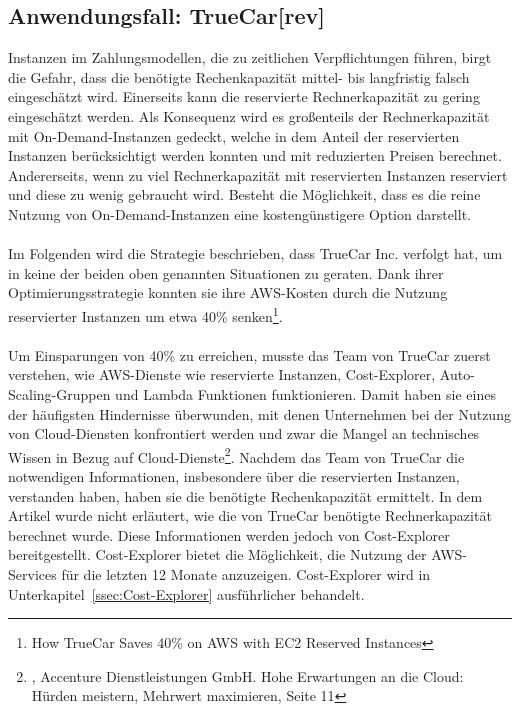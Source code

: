 \subsection{Anwendungsfall: TrueCar[rev]}\label{ssec:UseCaseTrueCar}
Instanzen im Zahlungsmodellen, die zu zeitlichen Verpflichtungen führen, birgt die Gefahr, dass die benötigte Rechenkapazität mittel- bis langfristig falsch eingeschätzt wird. Einerseits kann die reservierte Rechnerkapazität zu gering eingeschätzt werden. Als Konsequenz wird es großenteils der Rechnerkapazität mit On-Demand-Instanzen gedeckt, welche in dem Anteil der reservierten Instanzen berücksichtigt werden konnten und mit reduzierten Preisen berechnet. Andererseits, wenn zu viel Rechnerkapazität mit reservierten Instanzen reserviert und diese zu wenig gebraucht wird. Besteht die Möglichkeit, dass es die reine Nutzung von On-Demand-Instanzen eine kostengünstigere Option darstellt.
\\\\
Im Folgenden wird die Strategie beschrieben, dass TrueCar Inc. verfolgt hat, um in keine der beiden oben genannten Situationen zu geraten. Dank ihrer Optimierungsstrategie konnten sie ihre AWS-Kosten durch die Nutzung reservierter Instanzen um etwa 40\% senken\footnote{\cite{MED1}How TrueCar Saves 40\% on AWS with EC2 Reserved Instances}.
\\\\
Um Einsparungen von 40\% zu erreichen, musste das Team von TrueCar zuerst verstehen, wie AWS-Dienste wie reservierte Instanzen, Cost-Explorer, Auto-Scaling-Gruppen und Lambda Funktionen funktionieren. Damit haben sie eines der häufigsten Hindernisse überwunden, mit denen Unternehmen bei der Nutzung von Cloud-Diensten konfrontiert werden und zwar die Mangel an technisches Wissen in Bezug auf Cloud-Dienste\footnote{\cite{ACC1}, Accenture Dienstleistungen GmbH. Hohe Erwartungen an die Cloud: Hürden meistern, Mehrwert maximieren, Seite 11}. Nachdem das Team von TrueCar die notwendigen Informationen, insbesondere über die reservierten Instanzen, verstanden haben, haben sie die benötigte Rechenkapazität ermittelt. In dem Artikel wurde nicht erläutert, wie die von TrueCar benötigte Rechnerkapazität berechnet wurde. Diese Informationen werden jedoch von Cost-Explorer bereitgestellt. Cost-Explorer bietet die Möglichkeit, die Nutzung der AWS-Services für die letzten 12 Monate anzuzeigen. Cost-Explorer wird in Unterkapitel~\ref{ssec:Cost-Explorer} ausführlicher behandelt.

